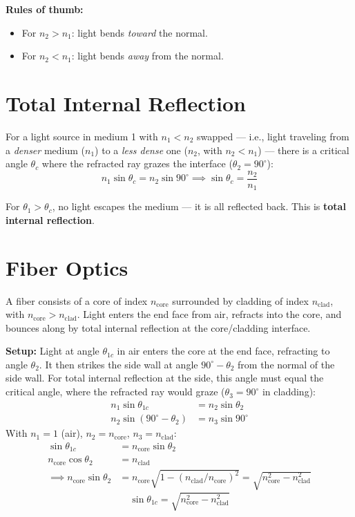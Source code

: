 \documentclass[11pt]{report}
\begin{document}
\textbf{Rules of thumb:}
\begin{itemize}
    \item For $n_2 > n_1$: light bends \emph{toward} the normal.
    \item For $n_2 < n_1$: light bends \emph{away} from the normal.
\end{itemize}

\section{Total Internal Reflection}

For a light source in medium 1 with $n_1 < n_2$ swapped --- i.e., light traveling from a \emph{denser} medium ($n_1$) to a \emph{less dense} one ($n_2$, with $n_2 < n_1$) --- there is a critical angle $\theta_c$ where the refracted ray grazes the interface ($\theta_2 = 90^\circ$):
\begin{equation}
n_1 \sin\theta_c = n_2 \sin 90^\circ \implies \boxed{\sin\theta_c = \frac{n_2}{n_1}}
\end{equation}

For $\theta_1 > \theta_c$, no light escapes the medium --- it is all reflected back. This is \textbf{total internal reflection}.

\section{Fiber Optics}

A fiber consists of a core of index $n_{\text{core}}$ surrounded by cladding of index $n_{\text{clad}}$, with $n_{\text{core}} > n_{\text{clad}}$. Light enters the end face from air, refracts into the core, and bounces along by total internal reflection at the core/cladding interface.

\textbf{Setup:} Light at angle $\theta_{1c}$ in air enters the core at the end face, refracting to angle $\theta_2$. It then strikes the side wall at angle $90^\circ - \theta_2$ from the normal of the side wall. For total internal reflection at the side, this angle must equal the critical angle, where the refracted ray would graze ($\theta_3 = 90^\circ$ in cladding):
\begin{align}
n_1 \sin\theta_{1c} &= n_2 \sin\theta_2 \\
n_2 \sin(90^\circ - \theta_2) &= n_3 \sin 90^\circ
\end{align}
With $n_1 = 1$ (air), $n_2 = n_{\text{core}}$, $n_3 = n_{\text{clad}}$:
\begin{align}
\sin\theta_{1c} &= n_{\text{core}} \sin\theta_2 \\
n_{\text{core}} \cos\theta_2 &= n_{\text{clad}} \\
\implies n_{\text{core}}\sin\theta_2 &= n_{\text{core}}\sqrt{1 - (n_{\text{clad}}/n_{\text{core}})^2} = \sqrt{n_{\text{core}}^2 - n_{\text{clad}}^2}
\end{align}
\begin{equation}
\boxed{\sin\theta_{1c} = \sqrt{n_{\text{core}}^2 - n_{\text{clad}}^2}}
\end{equation}
\end{document}
